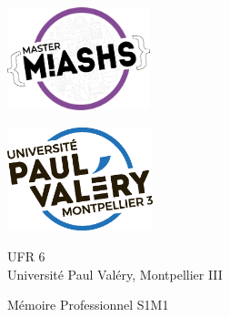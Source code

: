 \begin{minipage}{.4\textwidth}
\begin{center}
\includegraphics[height=3cm]{logos/master.pdf}
\end{center}
\end{minipage}%
\hspace{2cm}
\begin{minipage}{.4\textwidth}
\begin{center}
\includegraphics[height=3cm]{logos/upv.eps}
\end{center}
\end{minipage}%


\begin{center}
\vspace{1cm}
{\huge UFR 6}\\
Université Paul Valéry, Montpellier III\\
\vspace{1cm}

{\Large Mémoire Professionnel S1M1}
\end{center}
\noindent\makebox[\linewidth]{\rule{\paperwidth}{0.4pt}}
\vspace{-20em}
{\let\newpage\relax\maketitle}
\vspace{-15em}
\noindent\makebox[\linewidth]{\rule{\paperwidth}{0.4pt}}

\begin{minipage}{.45\textwidth}

\end{minipage}%
\hspace{0.5cm}
\begin{minipage}{.45\textwidth}
\vspace{3em}
  
\end{minipage}
\newpage